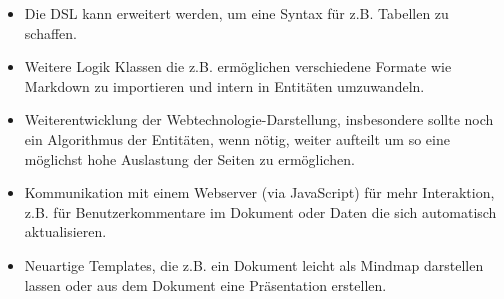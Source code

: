\begin{itemize}
  \item Die DSL kann erweitert werden,
        um eine Syntax für z.B. Tabellen zu schaffen.
  \item Weitere Logik Klassen die z.B. ermöglichen verschiedene Formate wie
        Markdown zu importieren und intern in Entitäten umzuwandeln.
  \item Weiterentwicklung der Webtechnologie-Darstellung, insbesondere
        sollte noch ein Algorithmus der Entitäten, wenn nötig,
        weiter aufteilt um so eine möglichst hohe Auslastung der Seiten
        zu ermöglichen.
  \item Kommunikation mit einem Webserver (via JavaScript) für mehr Interaktion,
        z.B. für Benutzerkommentare im Dokument oder Daten die sich automatisch
        aktualisieren.
  \item Neuartige Templates, die z.B. ein Dokument leicht als Mindmap
        darstellen lassen oder aus dem Dokument eine Präsentation erstellen.
\end{itemize}